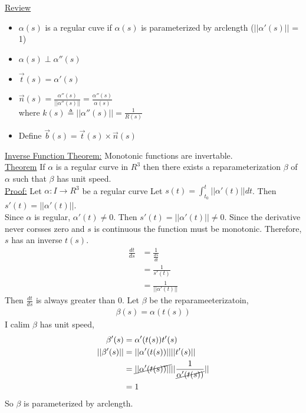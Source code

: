 \documentclass[12pt,letterpaper]{hmcpset}
\begin{document}
\underline{Review}
\begin{itemize}
\item $\alpha(s)$ is a regular cuve if $\alpha(s)$ is parameterized by arclength
  ($||\alpha'(s)||$ = 1)
\item $\alpha(s) \perp \alpha''(s)$
\item $\vec{t}(s) = \alpha'(s)$
\item $\vec{n}(s) = \frac{\alpha''(s)}{||\alpha''(s)||} = \frac{\alpha''(s)}{\alpha(s)}$ \\
  where $k(s) \triangleq ||\alpha''(s)|| = \frac{1}{R(s)}$
\item Define $\vec{b}(s) = \vec{t}(s) \times \vec{n}(s)$
\end{itemize}
\underline{Inverse Function Theorem:} Monotonic functions are invertable. \\
\underline{Theorem} If $\alpha$ is a regular curve in $R^3$ then there exists a
reparameterization $\beta$ of $\alpha$ such that $\beta$ has unit speed. \\
\underline{Proof:} Let $\alpha: I \rightarrow R^3$ be a regular curve Let $s(t) =
\int_{t_0}^t||\alpha'(t)|| dt$.
Then $s'(t) = ||\alpha'(t)||$. \\
Since $\alpha$ is regular, $\alpha'(t) \neq 0$. Then $s'(t) = ||\alpha'(t)|| \neq 0$. Since the
derivative never corsses zero and $s$ is continuous the function must be
monotonic. Therefore, $s$ has an inverse $t(s)$. 
\begin{align*}
  \frac{dt}{ds} &= \frac{1}{\frac{ds}{dt}} \\
                &= \frac{1}{s'(t)} \\
                &= \frac{1}{||\alpha'(t)||}
\end{align*}
Then $\frac{dt}{ds}$ is always greater than 0. Let $\beta$ be the
reparameeterizatoin,
\begin{align*}
  \beta(s) = \alpha(t(s))
\end{align*}
I calim $\beta$ has unit speed,
\begin{align*}
  \beta'(s) &= \alpha'(t(s))t'(s) \\
  ||\beta'(s)|| &= ||\alpha'(t(s))|| ||t'(s)|| \\
        &= \cancel{||\alpha'(t(s))||} ||\frac{1}{\cancel{\alpha'(t(s))}}|| \\
        &= 1
\end{align*}
So $\beta$ is parameterized by arclength.
\end{document}
